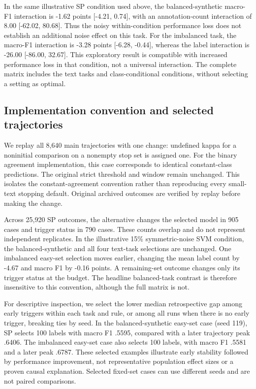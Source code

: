 \documentclass[10pt,twocolumn]{article}
\begin{document}
In the same illustrative SP condition used above, the balanced-synthetic macro-F1 interaction is -1.62 points [-4.21, 0.74], with an annotation-count interaction of 8.00 [-62.02, 80.68]. Thus the noisy within-condition performance loss does not establish an additional noise effect on this task. For the imbalanced task, the macro-F1 interaction is -3.28 points [-6.28, -0.44], whereas the label interaction is -26.00 [-86.00, 32.67]. This exploratory result is compatible with increased performance loss in that condition, not a universal interaction. The complete matrix includes the text tasks and class-conditional conditions, without selecting a setting as optimal.

\subsection{Implementation convention and selected trajectories}
We replay all 8,640 main trajectories with one change: undefined kappa for a noninitial comparison on a nonempty stop set is assigned one. For the binary agreement implementation, this case corresponds to identical constant-class predictions. The original strict threshold and window remain unchanged. This isolates the constant-agreement convention rather than reproducing every small-text stopping default. Original archived outcomes are verified by replay before making the change.

Across 25,920 SP outcomes, the alternative changes the selected model in 905 cases and trigger status in 790 cases. These counts overlap and do not represent independent replicates. In the illustrative 15\% symmetric-noise SVM condition, the balanced-synthetic and all four text-task selections are unchanged. One imbalanced easy-set selection moves earlier, changing the mean label count by -4.67 and macro F1 by -0.16 points. A remaining-set outcome changes only its trigger status at the budget. The headline balanced-task contrast is therefore insensitive to this convention, although the full matrix is not.

For descriptive inspection, we select the lower median retrospective gap among early triggers within each task and rule, or among all runs when there is no early trigger, breaking ties by seed. In the balanced-synthetic easy-set case (seed 119), SP selects 100 labels with macro F1 .5595, compared with a later trajectory peak .6406. The imbalanced easy-set case also selects 100 labels, with macro F1 .5581 and a later peak .6787. These selected examples illustrate early stability followed by performance improvement, not representative population effect sizes or a proven causal explanation. Selected fixed-set cases can use different seeds and are not paired comparisons.
\end{document}
